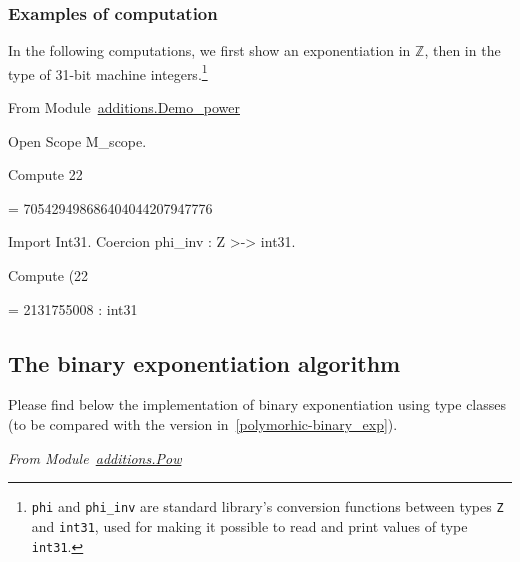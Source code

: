\subsubsection{Examples of computation}

In the following computations, we first show an exponentiation in $\mathds{Z}$, then in
the type of 31-bit machine integers.\footnote{\texttt{phi} and \texttt{phi\_inv} are 
standard library's conversion
functions between types \texttt{Z} and \texttt{int31}, used for making it possible to read  and print values of type \texttt{int31}.}

\vspace{4pt}

From Module~\href{../theories/html/additions.Demo_power.html}{additions.Demo\_power}



\begin{Coqsrc}
Open Scope M_scope.

Compute 22%
\end{Coqsrc}

\begin{Coqanswer}
= 705429498686404044207947776%
\end{Coqanswer}

\begin{Coqsrc}
Import Int31.
Coercion phi_inv : Z >-> int31.

Compute (22%
\end{Coqsrc}

\begin{Coqanswer}
   = 2131755008%
     : int31
\end{Coqanswer}

\subsection{The binary exponentiation algorithm}

Please find below the implementation of binary exponentiation using type classes
(to be compared with the version in~\vref{polymorhic-binary_exp}).



\vspace{4pt}
\emph{From Module~\href{../theories/html/additions.Pow.html}{additions.Pow}}

